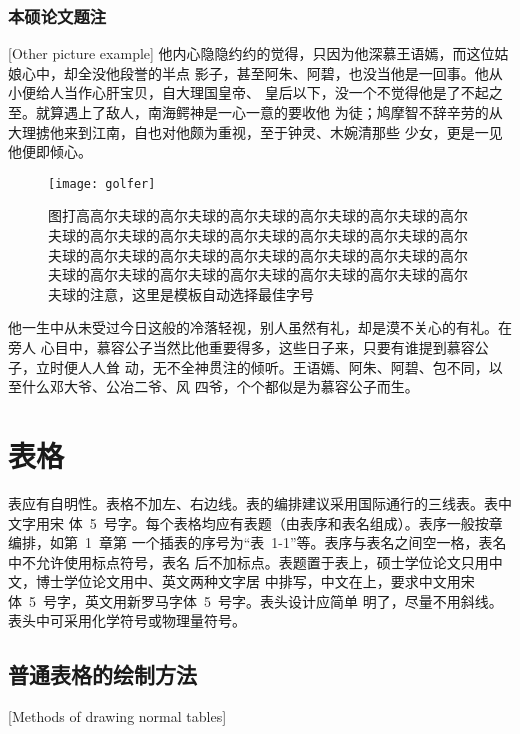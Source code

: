 \subsubsection{本硕论文题注}[Other picture example]
他内心隐隐约约的觉得，只因为他深慕王语嫣，而这位姑娘心中，却全没他段誉的半点
影子，甚至阿朱、阿碧，也没当他是一回事。他从小便给人当作心肝宝贝，自大理国皇帝、
皇后以下，没一个不觉得他是了不起之至。就算遇上了敌人，南海鳄神是一心一意的要收他
为徒；鸠摩智不辞辛劳的从大理掳他来到江南，自也对他颇为重视，至于钟灵、木婉清那些
少女，更是一见他便即倾心。
\begin{figure}[h]
\centering
\texttt{[image: golfer]}
\caption{图打高高尔夫球的高尔夫球的高尔夫球的高尔夫球的高尔夫球的高尔夫球的高尔夫球的高尔夫球的高尔夫球的高尔夫球的高尔夫球的高尔夫球的高尔夫球的高尔夫球的高尔夫球的高尔夫球的高尔夫球的高尔夫球的高尔夫球的高尔夫球的高尔夫球的高尔夫球的高尔夫球的高尔夫球的注意，这里是模板自动选择最佳字号}
\end{figure}
他一生中从未受过今日这般的冷落轻视，别人虽然有礼，却是漠不关心的有礼。在旁人
心目中，慕容公子当然比他重要得多，这些日子来，只要有谁提到慕容公子，立时便人人耸
动，无不全神贯注的倾听。王语嫣、阿朱、阿碧、包不同，以至什么邓大爷、公冶二爷、风
四爷，个个都似是为慕容公子而生。

\section{表格}

表应有自明性。表格不加左、右边线。表的编排建议采用国际通行的三线表。表中文字用宋
体~5~号字。每个表格均应有表题（由表序和表名组成）。表序一般按章编排，如第~1~章第
一个插表的序号为“表~1-1”等。表序与表名之间空一格，表名中不允许使用标点符号，表名
后不加标点。表题置于表上，硕士学位论文只用中文，博士学位论文用中、英文两种文字居
中排写，中文在上，要求中文用宋体~5~号字，英文用新罗马字体~5~号字。表头设计应简单
明了，尽量不用斜线。表头中可采用化学符号或物理量符号。


\subsection{普通表格的绘制方法}[Methods of drawing normal tables]


